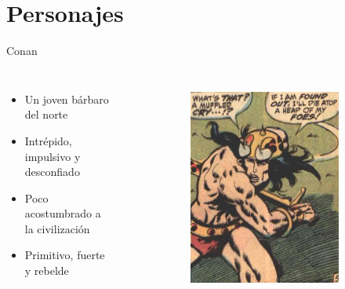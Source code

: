 \section{Personajes}
\begin{frame}{Conan}
\begin{columns}
\begin{itemize}
 \item Un joven bárbaro del norte
 \item Intrépido, impulsivo y desconfiado
 \item Poco acostumbrado a la civilización
 \item Primitivo, fuerte y rebelde
\end{itemize}
\begin{figure}[htp]
 \centering
 \begin{subfigure}[b]{0.3\textwidth}
   \includegraphics[width=\textwidth]{img/conan/CTB}
 \end{subfigure}
~
 \begin{subfigure}[b]{0.27\textwidth}

\end{subfigure}
\end{figure}
\end{columns}
\end{frame}
